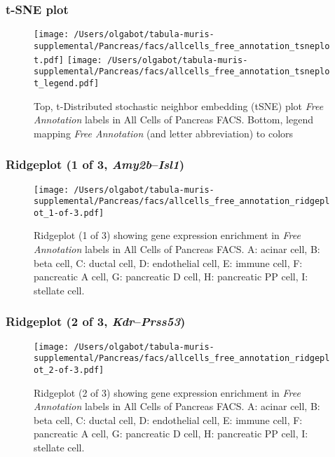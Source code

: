\clearpage
\subsubsection{t-SNE plot}
\begin{figure}[h]
\centering
\texttt{[image: /Users/olgabot/tabula-muris-supplemental/Pancreas/facs/allcells\_free\_annotation\_tsneplot.pdf]}
\texttt{[image: /Users/olgabot/tabula-muris-supplemental/Pancreas/facs/allcells\_free\_annotation\_tsneplot\_legend.pdf]}
\caption{Top, t-Distributed stochastic neighbor embedding (tSNE) plot  \emph{Free Annotation} labels in All Cells of Pancreas FACS. Bottom, legend mapping \emph{Free Annotation} (and letter abbreviation) to colors}
\end{figure}


\clearpage

\subsubsection{Ridgeplot (1 of 3, \emph{Amy2b}--\emph{Isl1})}
\begin{figure}[h]
\centering
\texttt{[image: /Users/olgabot/tabula-muris-supplemental/Pancreas/facs/allcells\_free\_annotation\_ridgeplot\_1-of-3.pdf]}

\caption{ Ridgeplot (1 of 3)  showing gene expression enrichment in \emph{Free Annotation} labels in All Cells of Pancreas FACS. A: acinar cell, B: beta cell, C: ductal cell, D: endothelial cell, E: immune cell, F: pancreatic A cell, G: pancreatic D cell, H: pancreatic PP cell, I: stellate cell.}
\end{figure}


\clearpage

\subsubsection{Ridgeplot (2 of 3, \emph{Kdr}--\emph{Prss53})}
\begin{figure}[h]
\centering
\texttt{[image: /Users/olgabot/tabula-muris-supplemental/Pancreas/facs/allcells\_free\_annotation\_ridgeplot\_2-of-3.pdf]}

\caption{ Ridgeplot (2 of 3)  showing gene expression enrichment in \emph{Free Annotation} labels in All Cells of Pancreas FACS. A: acinar cell, B: beta cell, C: ductal cell, D: endothelial cell, E: immune cell, F: pancreatic A cell, G: pancreatic D cell, H: pancreatic PP cell, I: stellate cell.}
\end{figure}


